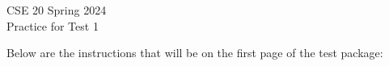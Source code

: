 

\newif \ifsolution
\solutiontrue
\solutionfalse

\newcommand{\sol}[1]{\medskip\fbox{\begin{minipage}{5.5in}{#1}\end{minipage}}\medskip}


\begin{center}
{\Large
CSE 20 Spring 2024\\ 
Practice for Test 1 \ifsolution{\qquad Solutions}\fi}
\end{center}

\thispagestyle{empty}

\ifsolution{}
\else{}
Below are the instructions that will be on the first page of the test package:

